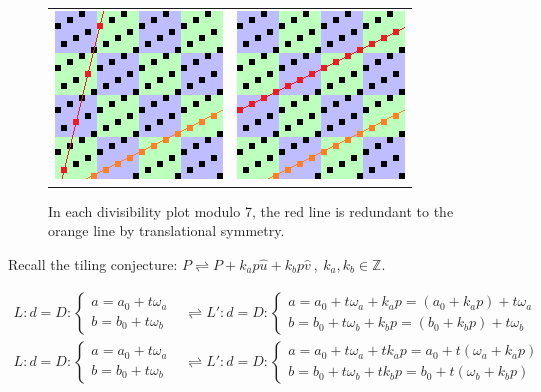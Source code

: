 \documentclass{article}
\begin{document}
\begin{figure}[h!]
	\centering
	\begin{tabular}{cc}
		\includegraphics{trans1} & \includegraphics{trans2}
	\end{tabular}
	\caption{In each divisibility plot modulo 7, the red line is redundant to the orange line by translational symmetry.}
	\label{trans}
\end{figure}

Recall the tiling conjecture: \(P \rightleftharpoons P + k_ap\hat{u} + k_bp\hat{v}\ ,\ k_a,k_b \in \mathbb{Z}\).

\begin{align}
	\nonumber L:d=D:\begin{cases}
			a=a_0+t\omega_a \\
			b=b_0+t\omega_b
			\end{cases}
	  &\rightleftharpoons L':d=D:\begin{cases}
									 a=a_0+t\omega_a+k_ap=(a_0+k_ap)+t\omega_a \\
									 b=b_0+t\omega_b+k_bp=(b_0+k_bp)+t\omega_b
									 \end{cases} \\
	\nonumber L:d=D:\begin{cases}
			a=a_0+t\omega_a \\
			b=b_0+t\omega_b
			\end{cases}
	  &\rightleftharpoons L':d=D:\begin{cases}
									 a=a_0+t\omega_a+tk_ap=a_0+t(\omega_a+k_ap) \\
									 b=b_0+t\omega_b+tk_bp=b_0+t(\omega_b+k_bp)
									 \end{cases}
\end{align}
\end{document}
